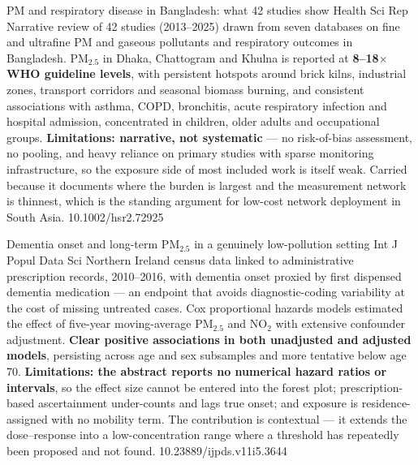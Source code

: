 \documentclass[10pt]{article}
\begin{document}
{PM and respiratory disease in Bangladesh: what 42 studies show}
{Health Sci Rep}
{Narrative review of 42 studies (2013--2025) drawn from seven databases on fine and
ultrafine PM and gaseous pollutants and respiratory outcomes in Bangladesh. PM$_{2.5}$ in
Dhaka, Chattogram and Khulna is reported at \textbf{8--18$\times$ WHO guideline levels},
with persistent hotspots around brick kilns, industrial zones, transport corridors and
seasonal biomass burning, and consistent associations with asthma, COPD, bronchitis, acute
respiratory infection and hospital admission, concentrated in children, older adults and
occupational groups. \textbf{Limitations: narrative, not systematic} --- no risk-of-bias
assessment, no pooling, and heavy reliance on primary studies with sparse monitoring
infrastructure, so the exposure side of most included work is itself weak. Carried
because it documents where the burden is largest and the measurement network is thinnest,
which is the standing argument for low-cost network deployment in South Asia.}
{10.1002/hsr2.72925}


{Dementia onset and long-term PM$_{2.5}$ in a genuinely low-pollution setting}
{Int J Popul Data Sci}
{Northern Ireland census data linked to administrative prescription records, 2010--2016,
with dementia onset proxied by first dispensed dementia medication --- an endpoint that
avoids diagnostic-coding variability at the cost of missing untreated cases. Cox
proportional hazards models estimated the effect of five-year moving-average PM$_{2.5}$
and NO$_2$ with extensive confounder adjustment. \textbf{Clear positive associations in
both unadjusted and adjusted models}, persisting across age and sex subsamples and more
tentative below age 70. \textbf{Limitations: the abstract reports no numerical hazard
ratios or intervals}, so the effect size cannot be entered into the forest plot;
prescription-based ascertainment under-counts and lags true onset; and exposure is
residence-assigned with no mobility term. The contribution is contextual --- it extends the
dose--response into a low-concentration range where a threshold has repeatedly been
proposed and not found.}
{10.23889/ijpds.v11i5.3644}
\end{document}
